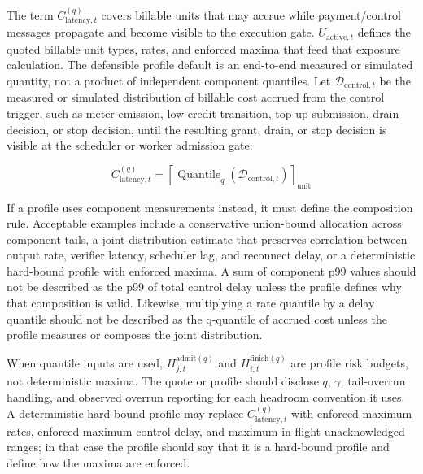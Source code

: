 \documentclass[11pt]{article}
\begin{document}
The term \(C_{\mathrm{latency},t}^{(q)}\) covers billable units that may accrue while payment/control messages propagate and become visible to the execution gate. \(U_{\mathrm{active},t}\) defines the quoted billable unit types, rates, and enforced maxima that feed that exposure calculation. The defensible profile default is an end-to-end measured or simulated quantity, not a product of independent component quantiles. Let \(\mathcal{D}_{\mathrm{control},t}\) be the measured or simulated distribution of billable cost accrued from the control trigger, such as meter emission, low-credit transition, top-up submission, drain decision, or stop decision, until the resulting grant, drain, or stop decision is visible at the scheduler or worker admission gate:

{\small
\[
C_{\mathrm{latency},t}^{(q)} =
\left\lceil
\operatorname{Quantile}_{q}\!\left(\mathcal{D}_{\mathrm{control},t}\right)
\right\rceil_{\mathrm{unit}}
\]
}

If a profile uses component measurements instead, it must define the composition rule. Acceptable examples include a conservative union-bound allocation across component tails, a joint-distribution estimate that preserves correlation between output rate, verifier latency, scheduler lag, and reconnect delay, or a deterministic hard-bound profile with enforced maxima. A sum of component p99 values should not be described as the p99 of total control delay unless the profile defines why that composition is valid. Likewise, multiplying a rate quantile by a delay quantile should not be described as the q-quantile of accrued cost unless the profile measures or composes the joint distribution.

When quantile inputs are used, \(H_{j,t}^{\mathrm{admit}(q)}\) and \(H_{i,t}^{\mathrm{finish}(q)}\) are profile risk budgets, not deterministic maxima. The quote or profile should disclose \(q\), \(\gamma\), tail-overrun handling, and observed overrun reporting for each headroom convention it uses. A deterministic hard-bound profile may replace \(C_{\mathrm{latency},t}^{(q)}\) with enforced maximum rates, enforced maximum control delay, and maximum in-flight unacknowledged ranges; in that case the profile should say that it is a hard-bound profile and define how the maxima are enforced.
\end{document}
